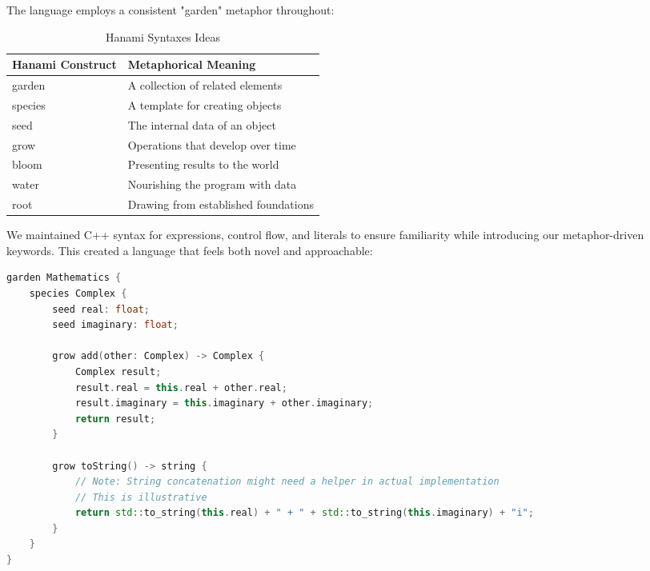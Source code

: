 \documentclass[conference]{IEEEtran}
\begin{document}
The language employs a consistent "garden" metaphor throughout:

\begin{table}[htbp] %
    \caption{Hanami Syntaxes Ideas}
    \label{table:syntaxes_ideas}
    \centering
    \begin{tabular}{@{}ll@{}} %
        \toprule
        \textbf{Hanami Construct} & \textbf{Metaphorical Meaning} \\
        \midrule
        garden & A collection of related elements \\
        species & A template for creating objects \\
        seed & The internal data of an object \\
        grow & Operations that develop over time \\
        bloom & Presenting results to the world \\
        water & Nourishing the program with data \\
        root & Drawing from established foundations \\
        \bottomrule
    \end{tabular}
\end{table}

We maintained C++ syntax for expressions, control flow, and literals to ensure familiarity while introducing our metaphor-driven keywords. This created a language that feels both novel and approachable:

\begin{lstlisting}[language=C++, caption={Hanami example with Complex numbers}, label={lst:complex_example}]
garden Mathematics {
    species Complex {
        seed real: float;
        seed imaginary: float;

        grow add(other: Complex) -> Complex {
            Complex result;
            result.real = this.real + other.real;
            result.imaginary = this.imaginary + other.imaginary;
            return result;
        }

        grow toString() -> string {
            // Note: String concatenation might need a helper in actual implementation
            // This is illustrative
            return std::to_string(this.real) + " + " + std::to_string(this.imaginary) + "i";
        }
    }
}
\end{lstlisting}
\end{document}

